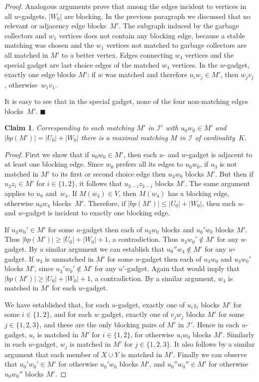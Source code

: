 \documentclass[preprint,12pt]{elsarticle}
\newcommand{\myqed}{$\blacksquare$}
\newcommand{\myproof}{\noindent\textit{Proof. }}
\newtheorem{claim}[theorem]{Claim}
\begin{document}
\begin{proof}
		Analogous arguments prove that among the edges incident to vertices in all $w$-gadgets, $|W_0|$ are blocking. In the previous paragraph we discussed that no relevant or adjacency edge blocks~$M'$. The subgraph induced by the garbage collectors and $w_1$ vertices does not contain any blocking edge, because a stable matching was chosen and the $w_1$ vertices not matched to garbage collectors are all matched in $M'$ to a better vertex. Edges connecting $w_4$ vertices and the special gadget are last choice edges of the matched $w_4$ vertices. In the $w$-gadget, exactly one edge blocks $M'$: if $w$ was matched and therefore $u_iw_j \in M'$, then $w_j v_j$, otherwise~$w_1v_1$.
		
		It is easy to see that in the special gadget, none of the four non-matching edges blocks~$M'$. \myqed

	\begin{claim}
		Corresponding to each matching $M'$ in $\mathcal{I'}$ with $u_0w_0 \in M'$ and $|bp(M')| = |U_0| + |W_0|$ there is a maximal matching $M$ in $\mathcal{I}$ of cardinality~$K$.
	\end{claim}
	\myproof First we show that if $u_0 w_0 \in M'$, then each $u$- and $w$-gadget is adjacent to at least one blocking edge. Since $w_0$ prefers all its edges to $u_0 w_0$, if $u_3$ is not matched in $M'$ to its first or second choice edge then $u_3w_0$ blocks $M'$.  But then if $u_3z_i\in M'$ for $i\in \{1,2\}$, it follows that $u_{3-i}z_{3-i}$ blocks $M'$.  The same argument applies to $u_0$ and~$w_4$. If $M(w_4) \in V$, then $M(w_4)$ has a blocking edge, otherwise $u_0w_4$ blocks~$M'$. Therefore, if $|bp(M')| \leq |U_0| + |W_0|$, then each $u$- and $w$-gadget is incident to exactly one blocking edge.
		
   If $u_3w_0'\in M'$ for some $u$-gadget then each of $u_3w_0$ blocks and $u_0'w_0$ blocks $M'$.  Thus $|bp(M')| \geq |U_0| + |W_0|+1$, a contradiction.  Thus $u_3w_0'\notin M'$ for any $u$-gadget.  By a similar argument we can establish that $u_0''w_4\notin M'$ for any $w$-gadget.  If $u_3$ is unmatched in $M'$ for some $u$-gadget then each of $u_3w_0$ and $u_3w_0'$ blocks $M'$, since $u_3'w_0'\notin M'$ for any $u'$-gadget.  Again that would imply that $|bp(M')| \geq |U_0| + |W_0|+1$, a contradiction.  By a similar argument, $w_4$ is matched in $M'$ for each $w$-gadget.
        
    We have established that, for each $u$-gadget, exactly one of $u_iz_i$ blocks $M'$ for some $i\in \{1,2\}$, and for each $w$ gadget, exactly one of $v_jw_j$ blocks $M'$ for some $j\in \{1,2,3\}$, and these are the only blocking pairs of $M'$ in $\mathcal I'$.  Hence in each $u$-gadget, $u_i$ is matched in $M'$ for $i\in \{1,2\}$, for otherwise $u_iw_0$ blocks $M'$.  Similarly in each $w$-gadget, $w_j$ is matched in $M'$ for $j\in \{1,2,3\}$.  It also follows by a similar argument that each member of $X\cup Y$ is matched in $M'$.  Finally we can observe that $u_0'w_0'\in M'$ for otherwise $u_0'w_0$ blocks $M'$, and $u_0''w_0''\in M'$ for otherwise $u_0w_0''$ blocks $M'$.
    

\end{proof}
\end{document}
